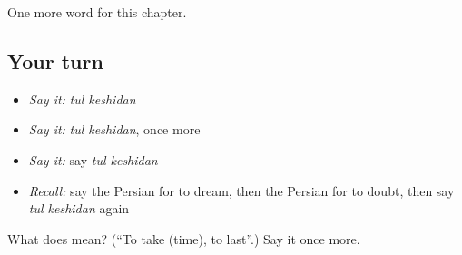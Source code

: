\begin{grammarlens}[title={What you've built}]
One more word for this chapter.
\end{grammarlens}

\subsection*{Your turn}
\begin{itemize}
\raggedright
  \item \emph{Say it:} \emph{tul keshidan}
  \item \emph{Say it:} \emph{tul keshidan}, once more
  \item \emph{Say it:} say \emph{tul keshidan}
  \item \emph{Recall:} say the Persian for to dream, then the Persian for to doubt, then say \emph{tul keshidan} again
\end{itemize}

\begin{tcolorbox}[breakable,colback=teal!4,colframe=teal!35!black,title={Before you move on}]
What does   mean? (\textquotedblleft{}To take (time), to last\textquotedblright{}.) Say it once more.
\end{tcolorbox}
